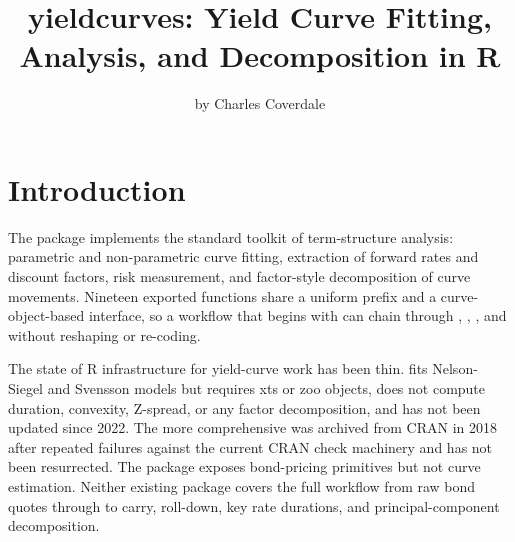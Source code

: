 \title{yieldcurves: Yield Curve Fitting, Analysis, and Decomposition in R}


\author{by Charles Coverdale}

\maketitle


\section{Introduction}\label{introduction}

The  package implements the standard toolkit
of term-structure analysis: parametric and non-parametric curve
fitting, extraction of forward rates and discount factors, risk
measurement, and factor-style decomposition of curve movements.
Nineteen exported functions share a uniform  prefix and
a curve-object-based interface, so a workflow that begins with
 can chain through ,
, , and 
without reshaping or re-coding.

The state of R infrastructure for yield-curve work has been thin.
 \citep{guirreri2022yieldcurve} fits Nelson-Siegel
and Svensson models but requires xts or zoo objects, does not
compute duration, convexity, Z-spread, or any factor decomposition,
and has not been updated since 2022. The more comprehensive
 was archived from CRAN in 2018 after repeated
failures against the current CRAN check machinery and has not been
resurrected. The  package exposes bond-pricing
primitives but not curve estimation. Neither existing package
covers the full workflow from raw bond quotes through to carry,
roll-down, key rate durations, and principal-component
decomposition.

